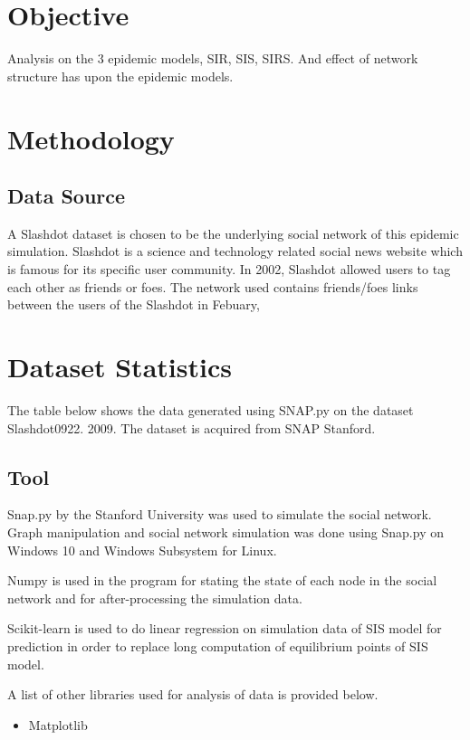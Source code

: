 \documentclass{subfiles}
\begin{document}
  \section{Objective}
  Analysis on the 3 epidemic models, SIR, SIS, SIRS. And effect of network structure has upon the epidemic models.
  \section{Methodology}
  \subsection{Data Source}
  A Slashdot dataset is chosen to be the underlying social network of this epidemic simulation. Slashdot is a science and technology related social news website which is famous for its specific user community. In 2002, Slashdot allowed users to tag each other as friends or foes. The network used contains friends/foes links between the users of the Slashdot in Febuary,
  \section{Dataset Statistics}
  The table below shows the data generated using SNAP.py on the dataset Slashdot0922. 2009\cite{leskovec2008community, snapnets}. The dataset is acquired from SNAP Stanford\cite{snapnets}.
  \subsection{Tool}
  Snap.py by the Stanford University was used to simulate the social network. Graph manipulation and social network simulation was done using Snap.py on Windows 10 and Windows Subsystem for Linux\cite{leskovec2016snap}.

  Numpy is used in the program for stating the state of each node in the social network and for after-processing the simulation data\cite{2020SciPy-NMeth}.

  Scikit-learn is used to do linear regression on simulation data of SIS model for prediction in order to replace long computation of equilibrium points of SIS model\cite{scikit-learn}.

  A list of other libraries used for analysis of data is provided below\cite{snapnets}.
  \begin{itemize}
    \item Matplotlib \cite{Hunter:2007}
  \end{itemize}
\end{document}
